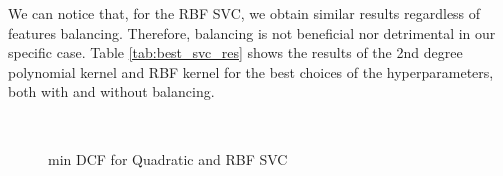 We can notice that, for the RBF SVC, we obtain similar results regardless of features balancing. Therefore, balancing is not beneficial nor detrimental in our specific case. Table \ref{tab:best_svc_res} shows the results of the 2nd degree polynomial kernel and RBF kernel for the best choices of the hyperparameters, both with and without balancing.

\begin{figure}[H]
	\\
	\caption{min DCF for Quadratic and RBF SVC}
	\label{fig:kern_svc_plot}
\end{figure}




